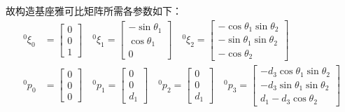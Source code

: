 \documentclass[UTF8, 13pt]{ctexart}
\begin{document}
故构造基座雅可比矩阵所需各参数如下：
\[
\begin{aligned}
    {}^0 \xi_0 &= \begin{bmatrix}
                    0 \\ 0 \\ 1
                \end{bmatrix} \quad
    {}^0 \xi_1 = \begin{bmatrix}
                    -\sin\theta_1 \\ \cos\theta_1 \\ 0
                \end{bmatrix} \quad
    {}^0 \xi_2 = \begin{bmatrix}
                    -\cos\theta_1 \sin\theta_2 \\ -\sin\theta_1 \sin\theta_2 \\ -\cos\theta_2
                \end{bmatrix} \\
    {}^0 p_0 &= \begin{bmatrix}
                    0 \\ 0 \\ 0
                \end{bmatrix} \quad
    {}^0 p_1 = \begin{bmatrix}
                    0 \\ 0 \\ d_1
                \end{bmatrix} \quad
    {}^0 p_2 = \begin{bmatrix}
                    0 \\ 0 \\ d_1
                \end{bmatrix} \quad
    {}^0 p_3 = \begin{bmatrix}
                    -d_3 \cos\theta_1 \sin\theta_2 \\
                    -d_3 \sin\theta_1 \sin\theta_2 \\
                    d_1 - d_3 \cos\theta_2
                \end{bmatrix} \\
\end{aligned}
\]
\end{document}
